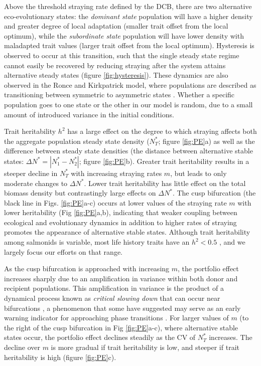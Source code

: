 \documentclass{revtex4}
\begin{document}
Above the threshold straying rate defined by the DCB, there are two alternative eco-evolutionary states: the \emph{dominant state} population will have a higher density and greater degree of local adaptation (smaller trait offset from the local optimum), while the \emph{subordinate state} population will have lower density with maladapted trait values (larger trait offset from the local optimum). 
Hysteresis is observed to occur at this transition, such that the single steady state regime cannot easily be recovered by reducing straying after the system attains alternative steady states (figure \ref{fig:hysteresis}).
These dynamics are also observed in the Ronce and Kirkpatrick model, where populations are described as transitioning between symmetric to asymmetric states \citep{Ronce:2001dp}.
Whether a specific population goes to one state or the other in our model is random, due to a small amount of introduced variance in the initial conditions.






Trait heritability $h^2$ has a large effect on the degree to which straying affects both the aggregate population steady state density ($N^*_T$; figure \ref{fig:PE}a) as well as the difference between steady state densities (the distance between alternative stable states: $\Delta N^*=|N^*_1-N^*_2|$; figure \ref{fig:PE}b).
Greater trait heritability results in a steeper decline in $N_T^*$ with increasing straying rates $m$, but leads to only moderate changes to $\Delta N^*$.
Lower trait heritability has little effect on the total biomass density but contrastingly large effects on $\Delta N^*$.
The cusp bifurcation (the black line in Figs. \ref{fig:PE}a-c) occurs at lower values of the straying rate $m$ with lower heritability (Fig \ref{fig:PE}a,b), indicating that weaker coupling between ecological and evolutionary dynamics in addition to higher rates of straying promotes the appearance of alternative stable states.
Although trait heritability among salmonids is variable, most life history traits have an $h^2 <0.5$ \citep{Carlson:2008hl}, and we largely focus our efforts on that range.

As the cusp bifurcation is approached with increasing $m$, the portfolio effect increases sharply due to an amplification in variance within both donor and recipient populations.
This amplification in variance is the product of a dynamical process known as \emph{critical slowing down} that can occur near bifurcations \citep{Scheffer:2009gg}, a phenomenon that some have suggested may serve as an early warning indicator for approaching phase transitions \citep{Scheffer:2009gg,Lade:2012eu,Anonymous:2013br,Dakos:2014br,Krkosek:2014ch}.
For larger values of $m$ (to the right of the cusp bifurcation in Fig \ref{fig:PE}a-c), where alternative stable states occur, the portfolio effect declines steadily as the CV of $N_T^*$ increases.
The decline over $m$ is more gradual if trait heritability is low, and steeper if trait heritability is high (figure \ref{fig:PE}c).
\end{document}
